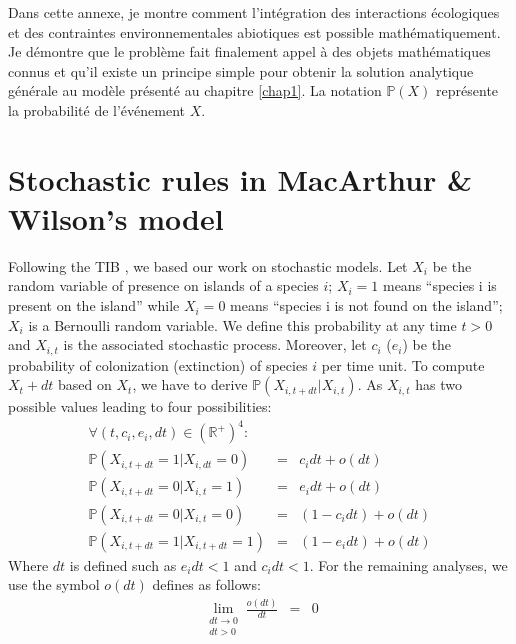 \label{annII}
\addtocounter{chapter}{1}
\setcounter{equation}{0}


Dans cette annexe, je montre comment l'intégration des interactions écologiques
et des contraintes environnementales abiotiques est possible mathématiquement.
Je démontre que le problème fait finalement appel à des objets mathématiques
connus et qu'il existe un principe simple pour obtenir la solution analytique
générale au modèle présenté au chapitre \ref{chap1}. La notation $\mathbb{P}(X)$
représente la probabilité de l'événement $X$.





\section{Stochastic rules in MacArthur \& Wilson's model}

Following the TIB \cite{MacArthur1967}, we based our work on stochastic models. Let $X_{i}$ be the random variable of presence on islands of a species $i$; $X_i=1$ means ``species i is present on the island'' while $X_i=0$ means ``species i is not found on the island''; $X_i$ is a Bernoulli random variable. We define this probability at any time $t>0$ and $X_{i,t}$ is the associated stochastic process. Moreover, let $c_i$ ($e_i$) be the probability of colonization (extinction) of species $i$ per time unit. To compute $X_t+dt$ based on $X_t$, we have to derive $ \mathbb{P}(X_{i,t+dt}|X_{i,t})$. As $X_{i,t}$ has two possible values leading to four possibilities:
\begin{eqnarray}
\nonumber \forall (t,c_i, e_i,dt)\in (\mathbb{R}^{+})^{4}: & &  \\
\label{eqAnn2_1} \mathbb{P}(X_{i,t+dt}=1|X_{i,dt}=0)&=&c_idt+o(dt)\\
\label{eqAnn2_2} \mathbb{P}(X_{i,t+dt}=0|X_{i,t}=1)&=&e_idt+o(dt) \\
\label{eqAnn2_3} \mathbb{P}(X_{i,t+dt}=0|X_{i,t}=0)&=&(1-c_idt)+o(dt) \\
\label{eqAnn2_4} \mathbb{P}(X_{i,t+dt}=1|X_{i,t+dt}=1)&=&(1-e_idt)+o(dt)
\end{eqnarray}
Where $dt$ is defined such as $e_idt<1$ and $c_idt<1$. For the remaining analyses, we use the symbol $o(dt)$ defines as follows:
\begin{eqnarray}
\nonumber \lim\limits_{\substack{dt \to 0 \\ dt>0}}\frac{o(dt)}{dt}&=&0
\end{eqnarray}

